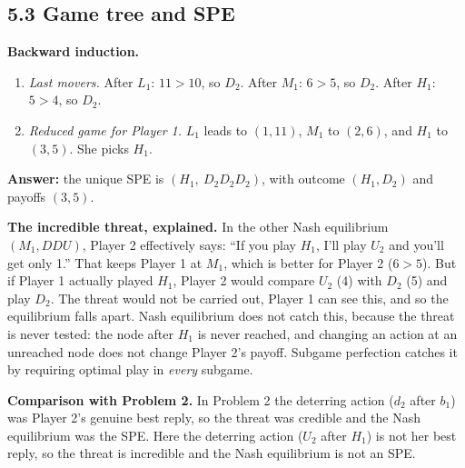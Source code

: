 \documentclass[11pt]{article}
\begin{document}
\subsection*{5.3 Game tree and SPE}
\begin{center}
\end{center}
\textbf{Backward induction.}
\begin{enumerate}
\item \emph{Last movers.} After $L_1$: $11>10$, so $D_2$. After $M_1$: $6>5$, so $D_2$. After $H_1$: $5>4$, so $D_2$.
\item \emph{Reduced game for Player 1.} $L_1$ leads to $(1,11)$, $M_1$ to $(2,6)$, and $H_1$ to $(3,5)$. She picks $H_1$.
\end{enumerate}
\textbf{Answer:} the unique SPE is $(H_1,\ D_2D_2D_2)$, with outcome $(H_1,D_2)$ and payoffs $(3,5)$.

\textbf{The incredible threat, explained.} In the other Nash equilibrium $(M_1,DDU)$, Player 2 effectively says: ``If you play $H_1$, I'll play $U_2$ and you'll get only 1.'' That keeps Player 1 at $M_1$, which is better for Player 2 ($6>5$). But if Player 1 actually played $H_1$, Player 2 would compare $U_2$ (4) with $D_2$ (5) and play $D_2$. The threat would not be carried out, Player 1 can see this, and so the equilibrium falls apart. Nash equilibrium does not catch this, because the threat is never tested: the node after $H_1$ is never reached, and changing an action at an unreached node does not change Player 2's payoff. Subgame perfection catches it by requiring optimal play in \emph{every} subgame.

\textbf{Comparison with Problem 2.} In Problem 2 the deterring action ($d_2$ after $b_1$) was Player 2's genuine best reply, so the threat was credible and the Nash equilibrium was the SPE. Here the deterring action ($U_2$ after $H_1$) is not her best reply, so the threat is incredible and the Nash equilibrium is not an SPE.
\end{document}
